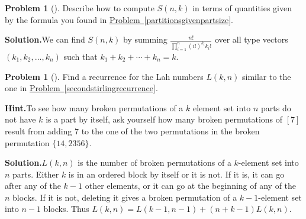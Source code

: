 \documentclass[10pt,]{book}
\theoremstyle{plain}
\theoremstyle{definition}
\newtheorem{activity}[project]{Problem}
\theoremstyle{definition}
\numberwithin{equation}{chapter}
\begin{document}
\begin{activity}[]\label{activity-140}
Describe how to compute \(S(n,k)\) in terms of quantities given by the formula you found in \hyperref[partitionsgivenpartsize]{Problem~\ref{partitionsgivenpartsize}}.%
\par\medskip\noindent%
\textbf{Solution.}\quad We can find \(S(n,k)\) by summing \(\frac{n!}{\prod_{i=1}^n (i!)^{k_i}{k_i!}}\) over all type vectors \((k_1,k_2,\ldots,k_n)\) such that \(k_1+k_2+\cdots+k_n=k\).%
\end{activity}
\begin{activity}[]\label{activity-141}
Find a recurrence for the Lah numbers \(L(k,n)\) similar to the one in \hyperref[secondstirlingrecurrence]{Problem~\ref{secondstirlingrecurrence}}.%
\par\medskip\noindent%
\textbf{Hint.}\quad To see how many broken permutations of a \(k\) element set into \(n\) parts do not have \(k\) is a part by itself, ask yourself how many broken permutations of \([7]\) result from adding 7 to the one of the two permutations in the broken permutation \(\{14, 2356\}\).%
\par\medskip\noindent%
\textbf{Solution.}\quad \(L(k,n)\) is the number of broken permutations of a \(k\)-element set into \(n\) parts. Either \(k\) is in an ordered block by itself or it is not. If it is, it can go after any of the \(k-1\) other elements, or it can go at the beginning of any of the \(n\) blocks. If it is not, deleting it gives a broken permutation of a \(k-1\)-element set into \(n-1\) blocks. Thus \(L(k,n)=L(k-1,n-1) + (n+k-1)L(k,n)\).%
\end{activity}
\end{document}
